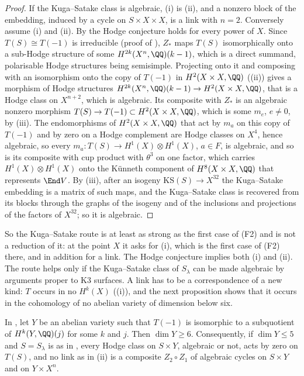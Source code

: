 \begin{proof}
If the Kuga--Satake class is algebraic, (i) is (ii), and a
nonzero block of the embedding, induced by a cycle on $S\times X\times X$, is
a link with $n=2$. Conversely assume (i) and (ii). By
 the Hodge conjecture holds for every power of $X$.
Since $T(S)\cong T(-1)$ is irreducible (proof of ),
$Z_{*}$ maps $T(S)$ isomorphically onto a sub-Hodge structure of some
$H^{2k}(X^{n},\QQ)(k-1)$, which is a direct summand, polarisable Hodge
structures being semisimple. Projecting onto it and composing with an
isomorphism onto the copy of $T(-1)$ in $H^{2}(X\times X,\QQ)$
((ii)) gives a morphism of Hodge structures
$H^{2k}(X^{n},\QQ)(k-1)\to H^{2}(X\times X,\QQ)$, that is a Hodge class on
$X^{n+2}$, which is algebraic. Its composite with $Z_{*}$ is an algebraic
nonzero morphism $T(S)\to T(-1)\subset H^{2}(X\times X,\QQ)$, which is some
$m_{e}$, $e\ne0$, by (iii). The endomorphisms of
$H^{2}(X\times X,\QQ)$ that act by $m_{a}$ on this copy of $T(-1)$ and by zero
on a Hodge complement are Hodge classes on $X^{4}$, hence algebraic, so every
$m_{a}\colon T(S)\to H^{1}(X)\otimes H^{1}(X)$, $a\in F$, is algebraic, and so is
its composite with cup product with $\theta^{3}$ on one factor, which carries
$H^{1}(X)\otimes H^{1}(X)$ onto the K\"unneth component of $H^{8}(X\times X,\QQ)$
that represents $\End V$. By (iii), after an isogeny
$\mathrm{KS}(S)\to X^{32}$ the Kuga--Satake embedding is a matrix of such
maps, and the Kuga--Satake class is recovered from its blocks through the
graphs of the isogeny and of the inclusions and projections of the factors of
$X^{32}$; so it is algebraic.
\end{proof}

So the Kuga--Satake route is at least as strong as the first case of (F2) and
is not a reduction of it: at the point $X$ it asks for (i), which is the first
case of (F2) there, and in addition for a link. The Hodge conjecture
implies both (i) and (ii). The route helps only if the
Kuga--Satake class of $S_{\lambda}$ can be made algebraic by arguments proper
to K3 surfaces. A link has to be a correspondence of a new kind: $T$ occurs
in no $H^{k}(X)$ ((i)), and the next proposition
shows that it occurs in the cohomology of no abelian variety of dimension
below six.

\begin{proposition}\label{prop:mumfordcarrier}
In , let $Y$ be an abelian variety such that $T(-1)$ is
isomorphic to a subquotient of $H^{k}(Y,\QQ)(j)$ for some $k$ and $j$. Then
$\dim Y\ge6$. Consequently, if $\dim Y\le5$ and $S=S_{\lambda}$ is as in
, every Hodge class on $S\times Y$, algebraic or not, acts
by zero on $T(S)$, and no link as in (ii) is a
composite $Z_{2}\circ Z_{1}$ of algebraic cycles on $S\times Y$ and on
$Y\times X^{n}$.
\end{proposition}

